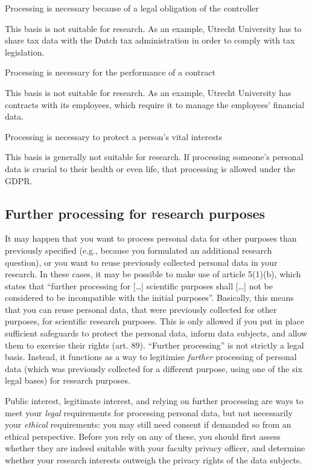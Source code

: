 \documentclass[
]{book}
\begin{document}
Processing is necessary because of a legal obligation of the controller

This basis is not suitable for research. As an example, Utrecht
University has to share tax data with the Dutch tax administration in
order to comply with tax legislation.

Processing is necessary for the performance of a contract

This basis is not suitable for research. As an example, Utrecht
University has contracts with its employees, which require it to manage
the employees' financial data.

Processing is necessary to protect a person's vital interests

This basis is generally not suitable for research. If processing
someone's personal data is crucial to their health or even life, that
processing is allowed under the GDPR.

\hypertarget{further-processing}{%
\subsection{Further processing for research purposes}\label{further-processing}}

It may happen that you want to process personal data for other purposes than
previously specified (e.g., because you formulated an additional research
question), or you want to reuse previously collected personal data in your
research. In these cases, it may be possible to make use of
article 5(1)(b),
which states that ``further processing for {[}\ldots{]} scientific purposes shall {[}\ldots{]}
not be considered to be incompatible with the initial purposes''. Basically, this
means that you can reuse personal data, that were previously collected for other
purposes, for scientific research purposes. This is only allowed if you put in
place sufficient safeguards to protect the personal data, inform data subjects,
and allow them to exercise their rights
(art. 89).
``Further processing'' is not strictly a legal basis. Instead, it functions as a
way to legitimise \emph{further} processing of personal data (which was previously
collected for a different purpose, using one of the six legal bases) for research
purposes.

Public interest, legitimate interest, and relying on further processing are ways
to meet your \emph{legal} requirements for processing personal data, but not
necessarily your \emph{ethical} requirements: you may still need consent if demanded
so from an ethical perspective. Before you rely on any of these, you should
first assess whether they are indeed suitable with your faculty
privacy officer,
and determine whether your research interests outweigh the privacy rights of
the data subjects.
\end{document}
